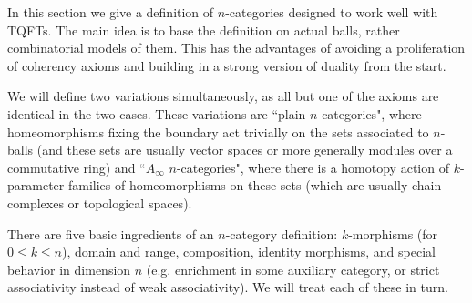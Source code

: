 \documentclass{pnastwo}
\begin{document}
\begin{article}
In this section we give a definition of $n$-categories designed to work well with TQFTs.
The main idea is to base the definition on actual balls, rather combinatorial models of them.
This has the advantages of avoiding a proliferation of coherency axioms and building in a strong
version of duality from the start.


%

We will define two variations simultaneously,  as all but one of the axioms are identical in the two cases.
These variations are ``plain $n$-categories", where homeomorphisms fixing the boundary
act trivially on the sets associated to $n$-balls
(and these sets are usually vector spaces or more generally modules over a commutative ring)
and ``$A_\infty$ $n$-categories",  where there is a homotopy action of
$k$-parameter families of homeomorphisms on these sets
(which are usually chain complexes or topological spaces).

There are five basic ingredients 
\cite{life-of-brian} of an $n$-category definition:
$k$-morphisms (for $0\le k \le n$), domain and range, composition,
identity morphisms, and special behavior in dimension $n$ (e.g. enrichment
in some auxiliary category, or strict associativity instead of weak associativity).
We will treat each of these in turn.


\end{article}
\end{document}
